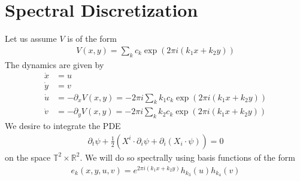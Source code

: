 \documentclass[12pt]{amsart}
\begin{document}
\section{Spectral Discretization}
\label{sec:spectral}
Let us assume $V$ is of the form
\begin{align*}
	V(x,y) = \sum_k c_k \exp \left( 2\pi i ( k_1 x + k_2 y) \right)
\end{align*}
The dynamics are given by
\begin{align*}
	\dot{x} &= u \\
	\dot{y} &= v \\
	\dot{u} &= - \partial_x V(x,y) = -2\pi i \sum_k k_1 c_k \exp \left( 2\pi i ( k_1 x + k_2 y) \right)  \\
	\dot{v} &= - \partial_y V(x,y) = -2\pi i \sum_k k_2 c_k \exp \left( 2\pi i ( k_1 x + k_2 y) \right)
\end{align*}
We desire to integrate the PDE
\begin{align*}
	\partial_t \psi + \frac{1}{2} \left(  X^i \cdot \partial_i \psi + \partial_i (X_i \cdot \psi) \right) = 0
\end{align*}
on the space $\mathbb{T}^2 \times \mathbb{R}^2$.
We will do so spectrally using basis functions of the form
\begin{align*}
	e_{k}(x,y,u,v) = e^{ 2\pi i( k_1 x+k_2 y) } h_{k_3}(u) h_{k_4}(v)
\end{align*}
\end{document}
